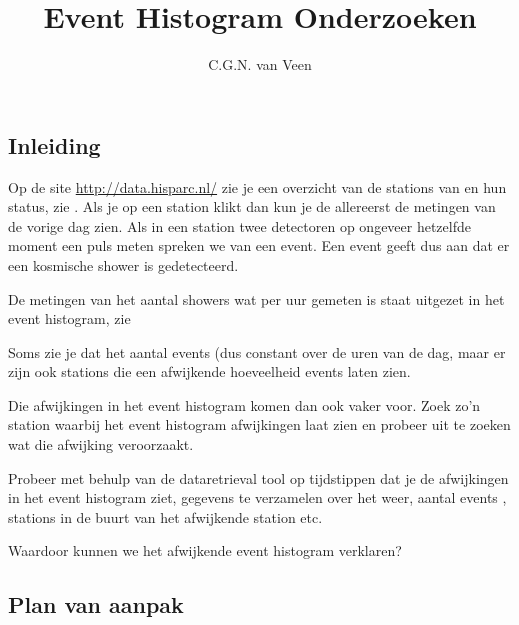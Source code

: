 


\title{Event Histogram Onderzoeken} 
\author{C.G.N. van Veen}



\maketitle

\begin{questions}

\begin{EnvUplevel}
\section{Inleiding}

Op de site \url{http://data.hisparc.nl/} zie je een overzicht van de
stations van \hisparc en hun status, zie . Als
je op een station klikt dan kun je de allereerst de metingen van de
vorige dag zien. Als in een station twee detectoren op ongeveer
hetzelfde moment een puls meten spreken we van een event. Een event
geeft dus aan dat er een kosmische shower is gedetecteerd.

De metingen van het aantal showers wat per uur gemeten is staat uitgezet
in het event histogram, zie 

Soms zie je dat het aantal events (dus  constant over de uren van de dag,
maar er zijn ook stations die een afwijkende hoeveelheid events laten
zien.

Die afwijkingen in het event histogram komen dan ook vaker
voor. Zoek zo'n station waarbij het event histogram afwijkingen laat
zien en probeer uit te zoeken wat die afwijking veroorzaakt.

Probeer met behulp van de dataretrieval tool op tijdstippen dat
je de afwijkingen in het event histogram ziet, gegevens te verzamelen
over het weer, aantal events , stations in de buurt van het afwijkende
station etc.
\end{EnvUplevel}

\question Waardoor kunnen we het afwijkende event
histogram verklaren?


\begin{EnvUplevel}
\section{Plan van aanpak}


\end{EnvUplevel}
\end{questions}
